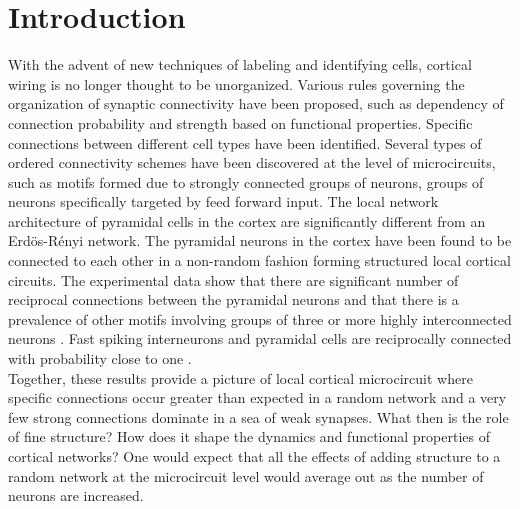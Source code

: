 \section{Introduction}
With the advent of new techniques of labeling and identifying cells, cortical wiring is no longer thought to be unorganized. Various rules governing the organization of synaptic connectivity have been proposed, such as dependency of connection probability and strength based on functional properties.  Specific connections between different cell types have been identified. Several types of ordered connectivity schemes have been discovered at the level of microcircuits, such as motifs formed due to strongly connected groups of neurons, groups of neurons specifically targeted by feed forward input. The local network architecture of pyramidal cells in the cortex are significantly different from an Erdös-Rényi network. The pyramidal neurons in the cortex have been found to be connected to each other in a non-random fashion forming structured local cortical circuits. The experimental data show that there are significant number of reciprocal connections between the pyramidal neurons and that there is a prevalence of other motifs involving groups of three or more highly interconnected neurons \cite{markram1997,thomson2002, Song2005, Perin2011}. Fast spiking interneurons and pyramidal cells are reciprocally connected with probability close to one \cite{Yoshimura2005}.\\
Together, these results provide a picture of local cortical microcircuit where specific connections occur greater than expected in a random network and a very few strong connections dominate in a sea of weak synapses. What then is the role of fine structure? How does it shape the dynamics and functional properties of cortical networks? One would expect that all the effects of adding structure to a random network at the microcircuit level would average out as the number of neurons are increased.  


